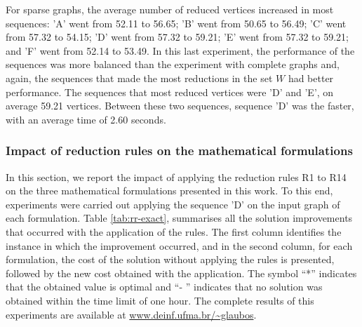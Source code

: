 \documentclass{singlecol-new}
\theoremstyle{TH}{
\newtheorem{lemma}{Lemma}
\newtheorem{theorem}[lemma]{Theorem}
\newtheorem{corrolary}[lemma]{Corrolary}
\newtheorem{conjecture}[lemma]{Conjecture}
\newtheorem{proposition}[lemma]{Proposition}
\newtheorem{claim}[lemma]{Claim}
\newtheorem{stheorem}[lemma]{Wrong Theorem}
}
\theoremstyle{THrm}{
\newtheorem{definition}{Definition}[section]
\newtheorem{question}{Question}[section]
\newtheorem{remark}{Remark}
\newtheorem{scheme}{Scheme}
}
\theoremstyle{THhit}{
\newtheorem{case}{Case}[section]
}
\begin{document}
For sparse graphs, the average number of reduced vertices increased in most sequences: 'A' went from 52.11 to 56.65; 'B' went from 50.65 to 56.49; 'C' went from 57.32 to 54.15; 'D' went from 57.32 to 59.21; 'E' went from 57.32 to 59.21; and 'F' went from 52.14 to 53.49. In this last experiment, the performance of the sequences was more balanced than the experiment with complete graphs and, again, the sequences that made the most reductions in the set $W$ had better performance. The sequences that most reduced vertices were 'D' and 'E', on average 59.21 vertices. Between these two sequences, sequence 'D' was the faster, with an average time of 2.60 seconds.  

\subsubsection{Impact of reduction rules on the mathematical formulations}
In this section, we report the impact of applying the reduction rules R1 to R14 on the three mathematical formulations presented in this work. To this end, experiments were carried out applying the sequence 'D' on the input graph of each formulation. Table \ref{tab:rr-exact},  summarises all the solution improvements that occurred with the application of the rules. The first column identifies the instance in which the improvement occurred, and in the second column, for each formulation, the cost of the solution without applying the rules is presented, followed by the new cost obtained with the application. The symbol ``*'' indicates that the obtained value is optimal and ``- '' indicates that no solution was obtained within the time limit of one hour. The complete results of this experiments are available at \url{www.deinf.ufma.br/~glaubos}.
\end{document}
